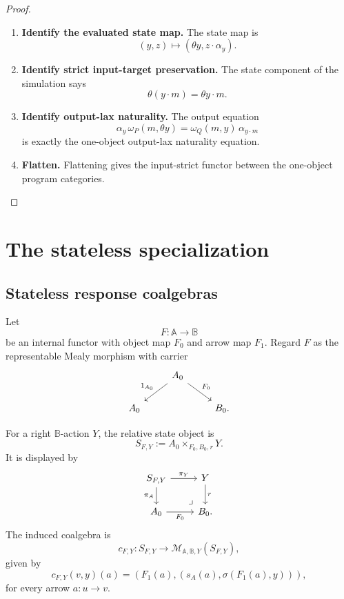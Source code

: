\begin{proof}
\leavevmode
\begin{enumerate}
\item \textbf{Identify the evaluated state map.}
The state map is
\[
(y,z)\mapsto(\theta y,z\cdot\alpha_y).
\]

\item \textbf{Identify strict input-target preservation.}
The state component of the simulation says
\[
\theta(y\cdot m)=\theta y\cdot m.
\]

\item \textbf{Identify output-lax naturality.}
The output equation
\[
\alpha_y\,\omega_P(m,\theta y)
=
\omega_Q(m,y)\,\alpha_{y\cdot m}
\]
is exactly the one-object output-lax naturality equation.

\item \textbf{Flatten.}
Flattening gives the input-strict functor between the one-object program
categories.
\end{enumerate}
\end{proof}

\section{The stateless specialization}
\label{sec:poly-relative-stateless-specialization}

\subsection{Stateless response coalgebras}
\label{subsec:poly-relative-stateless-response-coalgebras}

Let
\[
F:\mathbb A\to\mathbb B
\]
be an internal functor with object map \(F_0\) and arrow map \(F_1\).  Regard
\(F\) as the representable Mealy morphism with carrier
\[
\begin{tikzcd}
&
A_0
  \arrow[dl,"1_{A_0}"']
  \arrow[dr,"F_0"]
&
\\
A_0 && B_0 .
\end{tikzcd}
\]

For a right \(\mathbb B\)-action \(Y\), the relative state object is
\[
S_{F,Y}:=A_0\times_{F_0,B_0,r}Y.
\]
It is displayed by
\[
\begin{tikzcd}
S_{F,Y}
  \arrow[r,"\pi_Y"]
  \arrow[d,"\pi_A"']
&
Y
  \arrow[d,"r"]
\\
A_0
  \arrow[r,"F_0"']
&
B_0
\arrow[ul,phantom,very near start,"\lrcorner"] .
\end{tikzcd}
\]
The induced coalgebra is
\[
c_{F,Y}:
S_{F,Y}\to
\mathcal M_{\mathbb A,\mathbb B,Y}(S_{F,Y}),
\]
given by
\[
c_{F,Y}(v,y)(a)
=
\left(
F_1(a),
\left(
s_A(a),
\sigma(F_1(a),y)
\right)
\right),
\]
for every arrow \(a:u\to v\).

